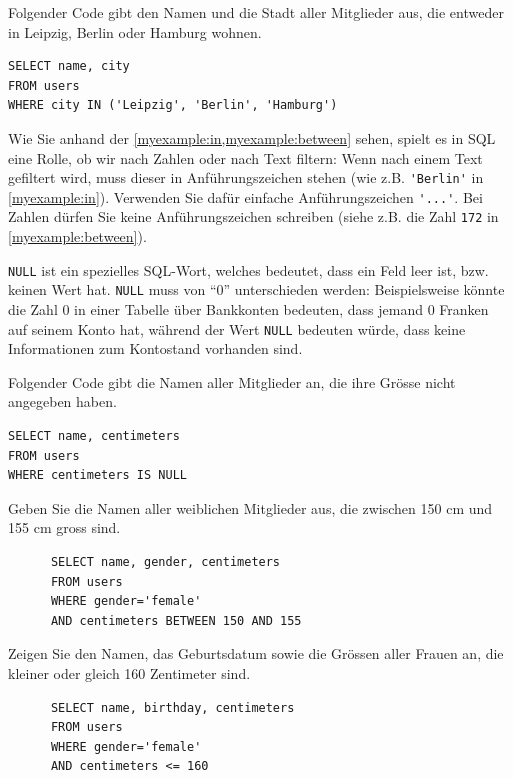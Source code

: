 \begin{myexample}\label{myexample:in}
Folgender Code gibt den Namen und die Stadt aller Mitglieder aus, die entweder in Leipzig, Berlin oder Hamburg wohnen.

\begin{lstlisting}
SELECT name, city
FROM users
WHERE city IN ('Leipzig', 'Berlin', 'Hamburg')
\end{lstlisting}
\end{myexample}


\begin{mycaution}
Wie Sie anhand der \cref{myexample:in,myexample:between} sehen, spielt es in SQL eine Rolle, ob wir nach Zahlen oder nach
  Text filtern: Wenn nach einem Text gefiltert wird, muss dieser in Anführungszeichen stehen (wie z.B.
  \lstinline|'Berlin'| in \cref{myexample:in}). Verwenden Sie dafür einfache Anführungszeichen \lstinline|'...'|. Bei Zahlen dürfen Sie keine Anführungszeichen schreiben (siehe z.B. die Zahl
  \lstinline|172| in \cref{myexample:between}).
\end{mycaution}

\lstinline|NULL| ist ein spezielles \gls{SQL}-Wort, welches bedeutet, dass ein Feld leer ist, bzw. keinen
Wert hat. \lstinline|NULL| muss von \enquote{0} unterschieden werden: Beispielsweise könnte die Zahl 0 in einer
Tabelle über Bankkonten bedeuten, dass jemand 0 Franken auf seinem Konto hat, während der Wert \lstinline|NULL| bedeuten würde, dass keine
Informationen zum Kontostand vorhanden sind.

\begin{myexample}
  Folgender Code gibt die Namen aller Mitglieder an, die ihre Grösse nicht angegeben haben.
\begin{lstlisting}
SELECT name, centimeters
FROM users
WHERE centimeters IS NULL
\end{lstlisting}
\end{myexample}


\begin{myexercise}
  Geben Sie die Namen aller weiblichen Mitglieder aus, die zwischen 150 cm und 155 cm gross sind.
  \begin{myanswer}
    \begin{lstlisting}
      SELECT name, gender, centimeters
      FROM users
      WHERE gender='female'
      AND centimeters BETWEEN 150 AND 155
    \end{lstlisting}
  \end{myanswer}
\end{myexercise}
\begin{myexercise}
  Zeigen Sie den Namen, das Geburtsdatum sowie die Grössen aller Frauen an, die kleiner oder gleich 160 Zentimeter sind.
  \begin{myanswer}
    \begin{lstlisting}
      SELECT name, birthday, centimeters
      FROM users
      WHERE gender='female'
      AND centimeters <= 160
    \end{lstlisting}
  \end{myanswer}
\end{myexercise}

